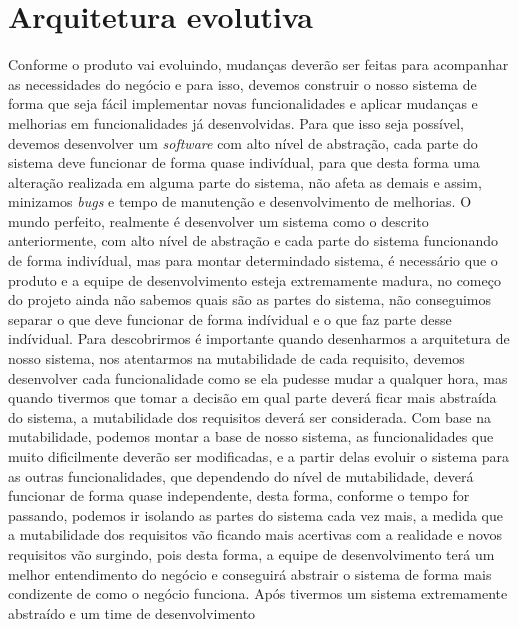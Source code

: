     \section{Arquitetura evolutiva}
      Conforme o produto vai evoluindo, mudanças deverão ser feitas para acompanhar
      as necessidades do negócio e para isso, devemos construir o nosso sistema de
      forma que seja fácil implementar novas funcionalidades e aplicar mudanças e
      melhorias em funcionalidades já desenvolvidas. Para que isso seja possível,
      devemos desenvolver um \textit{software} com alto nível de abstração, cada
      parte do sistema deve funcionar de forma quase indivídual, para que desta
      forma uma alteração realizada em alguma parte do sistema, não afeta as demais
      e assim, minizamos \textit{bugs} e tempo de manutenção e desenvolvimento de
      melhorias. \newline
      O mundo perfeito, realmente é desenvolver um sistema como o descrito anteriormente,
      com alto nível de abstração e cada parte do sistema funcionando de forma indivídual,
      mas para montar determindado sistema, é necessário que o produto e a equipe
      de desenvolvimento esteja extremamente madura, no começo do projeto ainda não
      sabemos quais são as partes do sistema, não conseguimos separar o que deve
      funcionar de forma indívidual e o que faz parte desse indívidual. Para
      descobrirmos é importante quando desenharmos a arquitetura de nosso sistema,
      nos atentarmos na mutabilidade de cada requisito, devemos desenvolver cada
      funcionalidade como se ela pudesse mudar a qualquer hora, mas quando tivermos
      que tomar a decisão em qual parte deverá ficar mais abstraída do sistema,
      a mutabilidade dos requisitos deverá ser considerada. Com base na mutabilidade,
      podemos montar a base de nosso sistema, as funcionalidades que muito dificilmente
      deverão ser modificadas, e a partir delas evoluir o sistema para as outras
      funcionalidades, que dependendo do nível de mutabilidade, deverá funcionar de
      forma quase independente, desta forma, conforme o tempo for passando, podemos
      ir isolando as partes do sistema cada vez mais, a medida que a mutabilidade
      dos requisitos vão ficando mais acertivas com a realidade e novos requisitos
      vão surgindo, pois desta forma, a equipe de desenvolvimento terá um melhor
      entendimento do negócio e conseguirá abstrair o sistema de forma mais condizente
      de como o negócio funciona. \newline
      Após tivermos um sistema extremamente abstraído e um time de desenvolvimento
